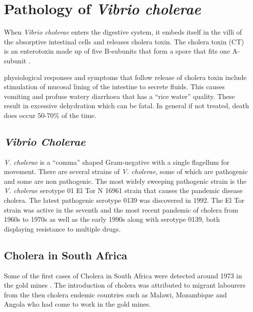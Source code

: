 \documentclass[12pt,a4paper]{article}
\begin{document}
\section{Pathology of \textit{Vibrio cholerae}}
When  \textit{Vibrio cholerae} enters the digestive system, it embeds itself in the villi of the absorptive intestinal cells and releases cholera toxin. The cholera toxin (CT) is an enterotoxin made up of five B-subunits that form a spore that fits one A-subunit \cite{Zhang}.

physiological responses and symptoms that follow release of cholera toxin include stimulation of mucosal lining of the intestine to secrete fluids. This causes vomiting and profuse watery diarrhoea that has a ``rice water'' quality. These result in excessive dehydration which can be fatal. In general if not treated, death does occur 50-70\% of the time.
\subsection{\textit{Vibrio Cholerae}}
\textit{V. cholerae} is a ``comma'' shaped Gram-negative with a single flagellum for movement. There are several strains of \textit{V. cholerae}, some of which are pathogenic and some are non pathogenic. The most widely sweeping pathogenic strain is the \textit{V. cholerae} serotype 01 El Tor N 16961 strain that causes the pandemic disease cholera.
The latest pathogenic serotype 0139 was discovered in 1992. The El Tor strain was active in the seventh and the most recent pandemic of cholera from 1960s to 1970s as well as the early 1990s along with serotype 0139, both displaying resistance to multiple drugs.

\subsection{Cholera in South Africa} 
Some of the first cases of Cholera in South Africa were detected around 1973 in the gold mines \cite{Isaacson}. The introduction of cholera was attributed to migrant labourers from the then cholera endemic countries such as Malawi, Mozambique and Angola who  had come to work in the gold mines. 

%

\end{document}
